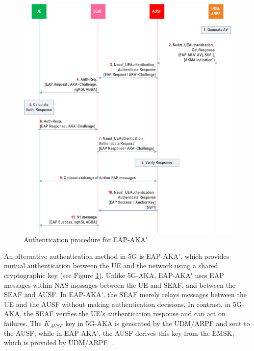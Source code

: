\begin{figure}
    \centering
    \includegraphics[width=0.75\linewidth]{figs/Authentication procedure for EAP-AKA'.png}
    \caption{Authentication procedure for \ac{EAP-AKA'}}
    \label{fig:Authentication procedure for EAP-AKA'}
\end{figure}

An alternative authentication method in \ac{5G} is \ac{EAP-AKA'}, which provides mutual authentication between the \ac{UE} and the network using a shared cryptographic key (see Figure \ref{fig:Authentication procedure for EAP-AKA'}). Unlike \ac{5G-AKA}, \ac{EAP-AKA'} uses \ac{EAP} messages within \ac{NAS} messages between the \ac{UE} and \ac{SEAF}, and between the \ac{SEAF} and \ac{AUSF}. In \ac{EAP-AKA'}, the \ac{SEAF} merely relays messages between the \ac{UE} and the \ac{AUSF} without making authentication decisions. In contrast, in \ac{5G-AKA}, the \ac{SEAF} verifies the \ac{UE}'s authentication response and can act on failures. The $K_{AUSF}$ key in \ac{5G-AKA} is generated by the \ac{UDM}/\ac{ARPF} and sent to the \ac{AUSF}, while in \ac{EAP-AKA'}, the \ac{AUSF} derives this key from the \ac{EMSK}, which is provided by \ac{UDM}/\ac{ARPF}~\cite{33.501-p49}.


